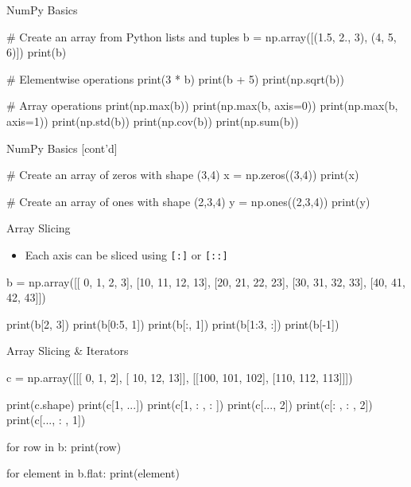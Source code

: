 \documentclass[ignorenonframetext,xcolor=x11names]{beamer}
\begin{document}
\begin{frame}[fragile]{NumPy Basics}
\footnotesize
\begin{pythoncode}
# Create an array from Python lists and tuples
b = np.array([(1.5, 2., 3), (4, 5, 6)])
print(b)

# Elementwise operations
print(3 * b)
print(b + 5)
print(np.sqrt(b))

# Array operations
print(np.max(b))
print(np.max(b, axis=0))
print(np.max(b, axis=1))
print(np.std(b))
print(np.cov(b))
print(np.sum(b))
\end{pythoncode}
\end{frame}

\begin{frame}[fragile]{NumPy Basics \small [cont'd]}
\footnotesize
\begin{pythoncode}
# Create an array of zeros with shape (3,4)
x = np.zeros((3,4))
print(x)

# Create an array of ones with shape (2,3,4)
y = np.ones((2,3,4))
print(y)
\end{pythoncode}
\end{frame}

\begin{frame}[fragile]{Array Slicing}
\begin{itemize}
    \item Each axis can be sliced using \texttt{[:]} or \texttt{[::]}
\end{itemize}
\footnotesize
\begin{pythoncode}
b = np.array([[ 0,  1,  2,  3],
              [10, 11, 12, 13],
              [20, 21, 22, 23],
              [30, 31, 32, 33],
              [40, 41, 42, 43]])
              
print(b[2, 3])
print(b[0:5, 1])
print(b[:, 1])
print(b[1:3, :])
print(b[-1])
\end{pythoncode}
\end{frame}

\begin{frame}[fragile]{Array Slicing \& Iterators}
\footnotesize
\begin{pythoncode}
c = np.array([[[  0,  1,  2],
               [ 10, 12, 13]],
              [[100, 101, 102],
               [110, 112, 113]]])
               
print(c.shape)
print(c[1, ...])
print(c[1, : , : ])
print(c[..., 2])
print(c[: , : , 2])
print(c[..., : , 1])

for row in b:
    print(row)
    
for element in b.flat:
    print(element)
\end{pythoncode}
\end{frame}
\end{document}
